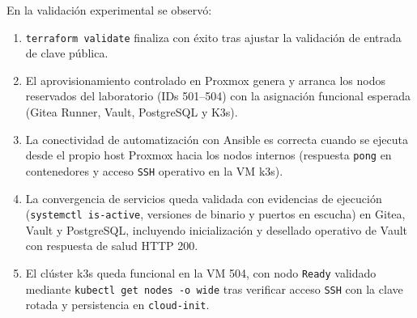 \documentclass[runningheads]{llncs}
\begin{document}
En la validación experimental se observó:
\begin{enumerate}
    \item \texttt{terraform validate} finaliza con éxito tras ajustar la validación de entrada de clave pública.
    \item El aprovisionamiento controlado en Proxmox genera y arranca los nodos reservados del laboratorio (IDs 501--504) con la asignación funcional esperada (Gitea Runner, Vault, PostgreSQL y K3s).
    \item La conectividad de automatización con Ansible es correcta cuando se ejecuta desde el propio host Proxmox hacia los nodos internos (respuesta \texttt{pong} en contenedores y acceso \texttt{SSH} operativo en la VM \gls{k3s}).
    \item La convergencia de servicios queda validada con evidencias de ejecución (\texttt{systemctl is-active}, versiones de binario y puertos en escucha) en Gitea, Vault y PostgreSQL, incluyendo inicialización y desellado operativo de Vault con respuesta de salud HTTP 200.
    \item El clúster \gls{k3s} queda funcional en la VM 504, con nodo \texttt{Ready} validado mediante \texttt{kubectl get nodes -o wide} tras verificar acceso \texttt{SSH} con la clave rotada y persistencia en \texttt{cloud-init}.
\end{enumerate}
\end{document}
